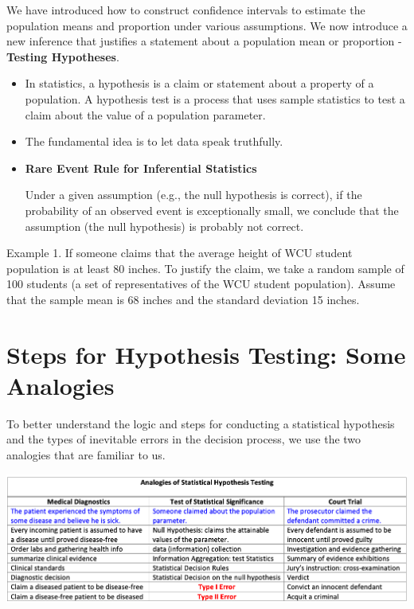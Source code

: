 \documentclass[
]{book}
\begin{document}
We have introduced how to construct confidence intervals to estimate the population means and proportion under various assumptions. We now introduce a new inference that justifies a statement about a population mean or proportion - \textbf{Testing Hypotheses}.

\begin{itemize}
\item
  In statistics, a hypothesis is a claim or statement about a property of a population. A hypothesis test is a process that uses sample statistics to test a claim about the value of a population parameter.
\item
  The fundamental idea is to let data speak truthfully.
\item
  \textbf{Rare Event Rule for Inferential Statistics}

  Under a given assumption (e.g., the null hypothesis is correct), if the probability of an observed event is exceptionally small, we conclude that the assumption (the null hypothesis) is probably not correct.
\end{itemize}

Example 1. If someone claims that the average height of WCU student population is at least 80 inches. To justify the claim, we take a random sample of 100 students (a set of representatives of the WCU student population). Assume that the sample mean is 68 inches and the standard deviation 15 inches.

\hfill\break

\hypertarget{steps-for-hypothesis-testing-some-analogies}{%
\section{Steps for Hypothesis Testing: Some Analogies}\label{steps-for-hypothesis-testing-some-analogies}}

To better understand the logic and steps for conducting a statistical hypothesis and the types of inevitable errors in the decision process, we use the two analogies that are familiar to us.

\begin{center}\includegraphics[width=1\linewidth]{week08/analogyHT} \end{center}
\end{document}
